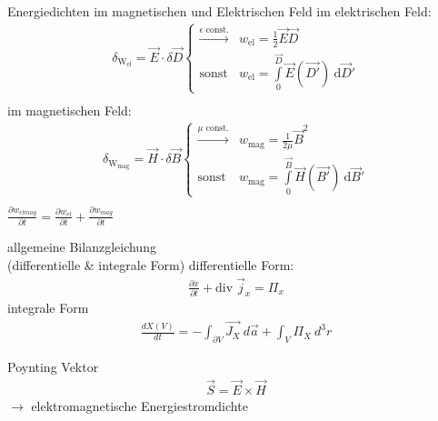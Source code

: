 \documentclass[a6paper]{kartei}
\renewcommand{\div}{\mathrm{div}\;}
\newcommand{\dd}{\ensuremath{\text{d}}}
\begin{document}
	\begin{karte}{Energiedichten im magnetischen und Elektrischen Feld}
	im elektrischen Feld:
		\begin{eqnarray*}
			\delta_{\text{W}_{\text{el}}} = \vec E  \cdot \delta\vec D \begin{cases}\overset{\epsilon \text{ const.}}{\longrightarrow} & w_{\text{el}} = \frac 1 2 \vec E \vec D \\\text{sonst} & w_{\text{el}} = \int\limits_{0}^{\vec{D}}\vec E (\vec{D'}) \ \dd \vec D' \end{cases}\\
		\end{eqnarray*}
		im magnetischen Feld:
			\begin{eqnarray*}
			\delta_{\text{W}_{\text{mag}}} = \vec H  \cdot \delta\vec B \begin{cases}\overset{\mu \text{ const.}}{\longrightarrow} & w_{\text{mag}} = \frac 1 {2\mu}  \vec B^2 \\\text{sonst} & w_{\text{mag}} = \int\limits_{0}^{\vec{B}}\vec H (\vec{B'}) \ \dd \vec B' \end{cases}\\
		\end{eqnarray*}
		$\frac{\partial w_{elmag}}{\partial t}=\frac{\partial w_{el}}{\partial t}+\frac{\partial w_{mag}}{\partial t}$

	\end{karte}

	\begin{karte}{allgemeine Bilanzgleichung\\ (differentielle \& integrale Form)}
		differentielle Form:
		\begin{eqnarray*}
			\frac{\partial x}{\partial t} + \div \vec j_x = \Pi_x
		\end{eqnarray*}
		integrale Form
		 \begin{eqnarray*}
  \frac{dX(V)}{dt} = - \int_{\partial V} \vec{J_{X}} \ d\vec{a} + \int_{V} \Pi_{X} \ d^{3}r
 \end{eqnarray*}
	\end{karte}

	\begin{karte}{Poynting Vektor}
		\begin{eqnarray*}
			\vec S = \vec E \times \vec H
		\end{eqnarray*}
		$\rightarrow$ elektromagnetische Energiestromdichte
	\end{karte}
\end{document}
